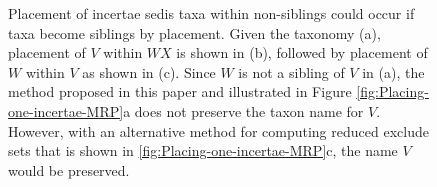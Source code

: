 \documentclass[english]{article}
\newcommand{\lyxdot}{.}
\begin{document}
\begin{figure}
\caption{\label{fig:Placing-one-incertae}
  Placement of incertae sedis taxa within non-siblings could occur if
  taxa become siblings by placement.  Given the taxonomy (a),
  placement of $V$ within $WX$ is shown in (b), followed by placement
  of $W$ within $V$ as shown in (c).  Since $W$ is not a sibling of
  $V$ in (a), the method proposed in this paper and illustrated in Figure
  \ref{fig:Placing-one-incertae-MRP}a does not preserve the taxon name
  for $V$.  However, with an alternative method for computing reduced
  exclude sets that is shown in \ref{fig:Placing-one-incertae-MRP}c,
  the name $V$ would be preserved.
  }
\end{figure}

\begin{figure}
\hfill{}
\hfill
{}
\end{figure}
\end{document}
